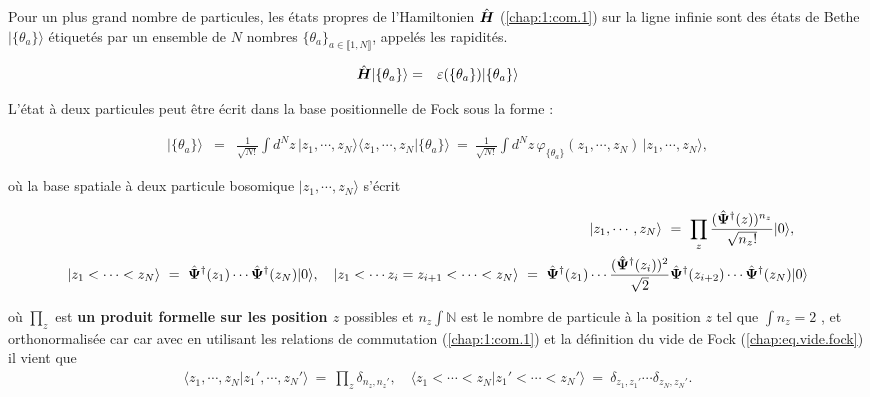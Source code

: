 Pour un plus grand nombre de particules, les états propres de l'Hamiltonien \(\hat{\bm{H}}\) (\ref{chap:1:com.1}) sur la ligne infinie sont des états de Bethe $\vert \{\theta_a\}\rangle $ étiquetés par un ensemble de $N$ nombres $\{\theta_a\}_{a \in \llbracket 1 , N \rrbracket } $, appelés les rapidités. %

\begin{eqnarray}
	\hat{\bm{H}} \vert \{\theta_a\}\rangle & = & \varepsilon(\{\theta_a\}) \vert \{\theta_a\}\rangle 		
\end{eqnarray}

L’état à deux particules peut être écrit dans la base positionnelle de Fock sous la forme :

\begin{eqnarray}
	\vert \{\theta_a\} \rangle & = & \frac{1}{\sqrt{N!}}\int d^Nz \, \vert z_1 , \cdots , z_N \rangle \langle z_1 , \cdots , z_N  \vert \{\theta_a\}  \rangle ~=~\frac{1}{\sqrt{N!}} \int d^Nz \, \varphi_{\{\theta_a\}}(z_1, \cdots ,  z_N)\, \vert z_1 , \cdots , z_N \rangle, \label{chap:1:N.part}
\end{eqnarray}

où la base spatiale à deux particule bosomique $\vert z_1 , \cdots ,  z_N \rangle$ s'écrit %

\begin{eqnarray}
	\vert z_1 , \cdots ,  z_N  \rangle  ~ = ~  \prod_z\frac{(\hat{\bm{\Psi}}^\dag(z))^{n_z}}{\sqrt{n_z !}} \vert 0 \rangle , \quad \\ \vert z_1 < \cdots <  z_N  \rangle  ~ = ~  \hat{\bm{\Psi}}^\dag(z_1) \cdots \hat{\bm{\Psi}}^\dag(z_N) \vert 0 \rangle, \quad \vert z_1 < \cdots z_i = z_{i+1} < \cdots  <  z_N  \rangle  ~ = ~  \hat{\bm{\Psi}}^\dag(z_1) \cdots \frac{(\hat{\bm{\Psi}}^\dag(z_i))^2}{\sqrt{2}} \hat{\bm{\Psi}}^\dag(z_{i+2})\cdots \hat{\bm{\Psi}}^\dag(z_N) \vert 0 \rangle
\end{eqnarray}

où $\prod_z$ est {\bf un produit formelle sur les position $z$} possibles et $n_z \int \mathbb{N}$ est le nombre de particule à la position $z$ tel que $\int n_z = 2$ , et orthonormalisée car car avec en utilisant les relations de commutation (\ref{chap:1:com.1})  et la définition du vide de Fock (\ref{chap:eq.vide.fock}) il vient que 
\begin{eqnarray}
	\langle z_1^{} , \cdots ,  z_N^{} \vert z_1' , \cdots ,  z_N' \rangle  ~ = ~ \prod_z\delta_{n_z^{},n_z'}, \quad \langle z_1^{} < \cdots <  z_N^{} \vert z_1' < \cdots <  z_N' \rangle  ~ = ~ \delta_{z_1^{},z_1'}\cdots\delta_{z_N^{},z_N'} .
\end{eqnarray}

